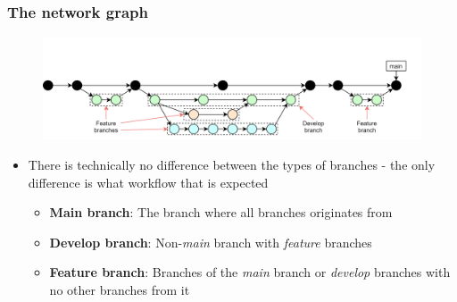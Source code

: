 \documentclass[aspectratio=169]{beamer} %
\begin{document}
\begin{frame}
	\frametitle{The network graph}

	\vspace{-.5cm}
	\begin{minipage}[t][5cm][t]{\textwidth}
		\begin{figure}
			\centering
			\includegraphics[width=\textwidth]{./img/dime-gitflow-network-names.png}
		\end{figure}
	\end{minipage}

	\vspace{-1cm}
	\begin{minipage}[t][5cm][t]{\textwidth}
		\begin{itemize}
			\setlength\itemsep{.4em}
			\item There is technically no difference between the types of branches - the only difference is what workflow that is expected
			\begin{itemize}
				\setlength\itemsep{.5em}
				\item \textbf{Main branch}: The branch where all branches originates from
				\item \textbf{Develop branch}: Non-\textit{main} branch with \textit{feature} branches
				\item \textbf{Feature branch}: Branches of the \textit{main} branch or \textit{develop} branches with no other branches from it
			\end{itemize}
		\end{itemize}
	\end{minipage}

\end{frame}
\end{document}
